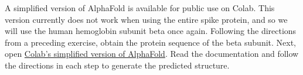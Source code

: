 A simplified version of AlphaFold is available for public use on Colab. This version currently does not work when using the entire spike protein, and so we will use the human hemoglobin subunit beta once again. Following the directions from a preceding exercise, obtain the protein sequence of the beta subunit. Next, open \href{https://colab.research.google.com/github/deepmind/alphafold/blob/main/notebooks/AlphaFold.ipynb#scrollTo=woIxeCPygt7K}{Colab's simplified version of AlphaFold}. Read the documentation and follow the directions in each step to generate the predicted structure.\\

\begin{exercise}\end{exercise}
